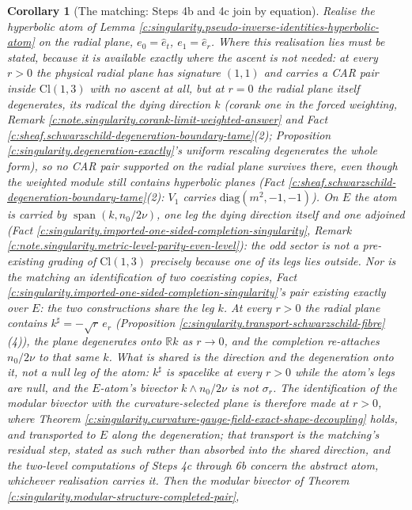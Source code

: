 \documentclass[11pt]{article}
\newtheorem{corollary}[theorem]{Corollary}
\theoremstyle{definition}
\theoremstyle{plain}
\newcommand{\changedmark}[2]{\marginpar{\raggedright\scriptsize\color{#1}#2}}
\providecommand{\Cl}{}\renewcommand{\Cl}{\mathrm{Cl}}
\providecommand{\R}{}\renewcommand{\R}{\mathbb{R}}
\providecommand{\er}{}\renewcommand{\er}{e_r}
\providecommand{\nO}{}\renewcommand{\nO}{n_0}
\begin{document}
\begin{corollary}[The matching: Steps 4b and 4c join by equation]\label{c:singularity.matching-steps-4b-4c-join-equation}
\changedmark{BrickRed}{corrected since the deposit}
Realise the hyperbolic atom of Lemma \ref{c:singularity.pseudo-inverse-identities-hyperbolic-atom} on the radial plane, $e_0 = \hat e_t$, $e_1 = \hat e_r$. Where this realisation lies must be stated, because it is available exactly where the ascent is not needed: at every $r > 0$ the physical radial plane has signature $(1,1)$ and carries a CAR pair inside $\Cl(1,3)$ with no ascent at all, but at $r = 0$ the radial plane itself degenerates, its radical the dying direction $k$ (corank one in the forced weighting, Remark \ref{c:note.singularity.corank-limit-weighted-answer} and Fact \ref{c:sheaf.schwarzschild-degeneration-boundary-tame}(2); Proposition \ref{c:singularity.degeneration-exactly}'s uniform rescaling degenerates the whole form), so no CAR pair supported on the radial plane survives there, even though the weighted module still contains hyperbolic planes (Fact \ref{c:sheaf.schwarzschild-degeneration-boundary-tame}(2): $V_1$ carries $\mathrm{diag}(m^2, -1, -1)$). On $E$ the atom is carried by $\operatorname{span}(k, \nO/2\nu)$, one leg the dying direction itself and one adjoined (Fact \ref{c:singularity.imported-one-sided-completion-singularity}, Remark \ref{c:note.singularity.metric-level-parity-even-level}): the odd sector is not a pre-existing grading of $\Cl(1,3)$ precisely because one of its legs lies outside. Nor is the matching an identification of two coexisting copies, Fact \ref{c:singularity.imported-one-sided-completion-singularity}'s pair existing exactly over $E$: the two constructions share the leg $k$. At every $r > 0$ the radial plane contains $k^{\sharp} = -\sqrt r\,\er$ (Proposition \ref{c:singularity.transport-schwarzschild-fibre}(4)), the plane degenerates onto $\R k$ as $r \to 0$, and the completion re-attaches $\nO/2\nu$ to that same $k$. What is shared is the direction and the degeneration onto it, not a null leg of the atom: $k^{\sharp}$ is spacelike at every $r > 0$ while the atom's legs are null, and the $E$-atom's bivector $k \wedge \nO/2\nu$ is not $\sigma_r$. The identification of the modular bivector with the curvature-selected plane is therefore made at $r > 0$, where Theorem \ref{c:singularity.curvature-gauge-field-exact-shape-decoupling} holds, and \emph{transported} to $E$ along the degeneration; that transport is the matching's residual step, stated as such rather than absorbed into the shared direction, and the two-level computations of Steps 4c through 6b concern the abstract atom, whichever realisation carries it. Then the modular bivector of Theorem \ref{c:singularity.modular-structure-completed-pair},

\end{corollary}
\end{document}
